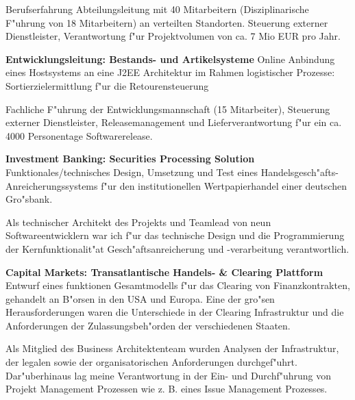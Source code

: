 \begin{rubric}{Berufserfahrung}
Abteilungsleitung mit 40 Mitarbeitern (Disziplinarische F"uhrung von 18 Mitarbeitern) an verteilten Standorten. Steuerung externer Dienstleister, Verantwortung f"ur Projektvolumen von ca. 7 Mio EUR pro Jahr.

\entry*[01/2005 - 07/2006] \textbf{Entwicklungsleitung: Bestands- und Artikelsysteme}\newline
{} 
Online Anbindung eines Hostsystems an eine J2EE Architektur im Rahmen logistischer Prozesse: Sortierzielermittlung f"ur die Retourensteuerung\axelvspace

Fachliche F"uhrung der Entwicklungsmannschaft (15 Mitarbeiter), Steuerung externer Dienstleister, Releasemanagement und Lieferverantwortung f"ur ein ca. 4000 Personentage Softwarerelease.\newline

\entry*[10/2003 - 12/2004] \textbf{Investment Banking: Securities Processing Solution}\newline
{} 
Funktionales/technisches Design, Umsetzung und Test eines Handelsgesch"afts-Anreicherungssystems f"ur den institutionellen Wertpapierhandel einer deutschen Gro"sbank.\axelvspace

Als technischer Architekt des Projekts und Teamlead von neun Softwareentwicklern war ich f"ur das technische Design und die Programmierung der Kernfunktionalit"at Gesch"aftsanreicherung und -verarbeitung verantwortlich. 

\entry*[07/2003 - 10/2003] \textbf{Capital Markets: Transatlantische Handels- \& Clearing Plattform}\newline
{} 
Entwurf eines funktionen Gesamtmodells f"ur das Clearing von Finanzkontrakten, gehandelt an B"orsen in den USA und Europa. Eine der gro"sen Herausforderungen waren die Unterschiede in der Clearing Infrastruktur und die Anforderungen der Zulassungsbeh"orden der verschiedenen Staaten.\axelvspace

Als Mitglied des Business Architektenteam wurden Analysen der Infrastruktur, der legalen sowie der organisatorischen Anforderungen durchgef"uhrt. Dar"uberhinaus lag meine Verantwortung in der Ein- und Durchf"uhrung von Projekt Management Prozessen wie z. B. eines Issue Management Prozesses.


\end{rubric}
